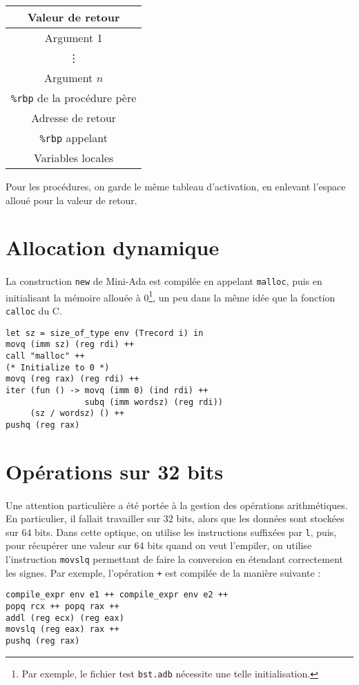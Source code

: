 \documentclass[a4paper,12pt]{article}
\begin{document}
\begin{center}
\begin{tabular}{|c|}
  \hline
  Valeur de retour\\
  \hline
  Argument 1\\
  \hline
  \vdots\\
  \hline
  Argument $n$\\
  \hline
  \texttt{\%rbp} de la procédure père\\
  \hline
  Adresse de retour\\ 
  \hline
  \texttt{\%rbp} appelant\\
  \hline
  Variables locales\\
  \hline
\end{tabular}
\end{center}

Pour les procédures, on garde le même tableau d'activation, en enlevant l'espace alloué pour la valeur de retour.

\section{Allocation dynamique}

\paragraph*{}
La construction \texttt{new} de Mini-Ada est compilée en appelant \texttt{malloc}, puis en initialisant la mémoire allouée à 0\footnote{Par exemple, le fichier
test \texttt{bst.adb} nécessite une telle initialisation.}, un peu dans la même idée que la fonction \texttt{calloc} du C.

\begin{lstlisting}
let sz = size_of_type env (Trecord i) in
movq (imm sz) (reg rdi) ++
call "malloc" ++
(* Initialize to 0 *)
movq (reg rax) (reg rdi) ++
iter (fun () -> movq (imm 0) (ind rdi) ++
                subq (imm wordsz) (reg rdi))
     (sz / wordsz) () ++
pushq (reg rax)
\end{lstlisting}

\section{Opérations sur 32 bits}

\paragraph*{}
Une attention particulière a été portée à la gestion des opérations arithmétiques. En particulier, il fallait travailler sur 32 bits, alors que les données
sont stockées sur 64 bits. Dans cette optique, on utilise les instructions suffixées par \texttt{l}, puis, pour récupérer une valeur sur 64 bits quand on
veut l'empiler, on utilise l'instruction \texttt{movslq} permettant de faire la conversion en étendant correctement les signes. Par exemple, l'opération
\texttt{+} est compilée de la manière suivante : 

\begin{lstlisting}
compile_expr env e1 ++ compile_expr env e2 ++
popq rcx ++ popq rax ++
addl (reg ecx) (reg eax)
movslq (reg eax) rax ++
pushq (reg rax)
\end{lstlisting}
\end{document}
